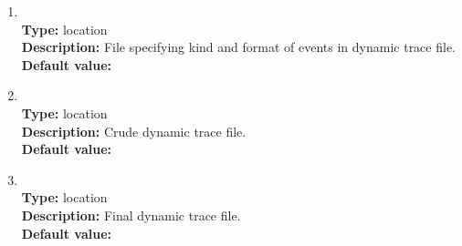 \begin{enumerate}
\item
{} \\
{\bf Type:} location \\
{\bf Description:} File specifying kind and format of events in dynamic trace file. \\
{\bf Default value:} 

\item
{} \\
{\bf Type:} location \\
{\bf Description:} Crude dynamic trace file. \\
{\bf Default value:}  

\item
{} \\
{\bf Type:} location \\
{\bf Description:} Final dynamic trace file. \\
{\bf Default value:} 
\end{enumerate}
